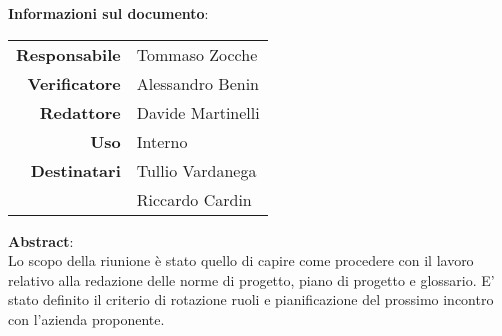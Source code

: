\begin{center}
\textbf{Informazioni sul documento}: \\
\vspace{0.5cm}

\begin{tabular}{r|l}
    \textbf{Responsabile} & Tommaso Zocche \\ 
    \textbf{Verificatore} & Alessandro Benin\\ 
    \textbf{Redattore} & Davide Martinelli \\ 
    \textbf{Uso} & Interno \\ 
    \textbf{Destinatari} & Tullio Vardanega \\ & Riccardo Cardin \\ 
\end{tabular}

\vfill

\textbf{Abstract}: \\
\vspace{0.5cm}
Lo scopo della riunione è stato quello di capire come procedere con il lavoro relativo alla redazione delle norme di progetto, piano di progetto e glossario. E' stato definito il criterio di rotazione ruoli e pianificazione del prossimo incontro con l'azienda proponente.
\end{center}


\bigskip